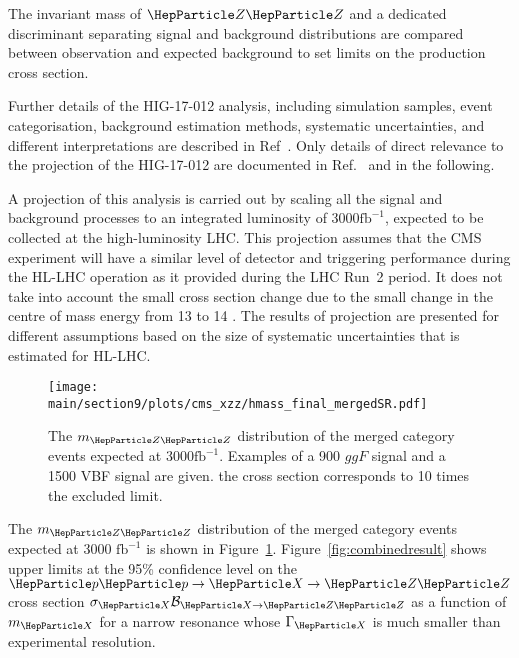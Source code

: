 The invariant mass of $\PZ \PZ$ and a dedicated discriminant separating signal and background distributions are compared between observation and expected background to set limits on the production cross section. 

Further details of the HIG-17-012 analysis, including simulation samples, event categorisation, background estimation methods, systematic uncertainties, and different interpretations are described in Ref~\cite{Sirunyan:2018qlb}. Only details of direct relevance to the projection of the HIG-17-012 are documented in Ref.~\cite{CMS-PAS-FTR-18-040} and in the following.  


A projection of this analysis is carried out by scaling all the signal
and background processes to an integrated luminosity of 3000$\mathrm{fb}^{-1}$, expected to be collected at the high-luminosity LHC. This projection assumes that the CMS experiment will have a similar level of detector and triggering performance during the HL-LHC operation as it provided during the LHC Run~2 period. It does not take into account the small cross section change due to the small change in the centre of mass energy from 13 \UTeV to 14 \UTeV. The results of projection are presented for different assumptions based on the size of systematic uncertainties that is estimated for HL-LHC. %

\begin{figure}[htbp]
        \centering
                \texttt{[image: \\main/section9/plots/cms\_xzz/hmass\_final\_mergedSR.pdf]}
                \caption{The $m_{\PZ\PZ}$ distribution of the merged category events expected at 3000$\mathrm{fb}^{-1}$. Examples of a 900 \UGeV $ggF$ signal and a 1500 \UGeV VBF signal are given. the cross section corresponds to 10 times the excluded limit. 
        \label{fig:mzz}
        }
            \end{figure}
The $m_{\PZ\PZ}$ distribution of the merged category events expected at 3000 $\mathrm{fb}^{-1}$ is shown in Figure~\ref{fig:mzz}. Figure~\ref{fig:combinedresult} shows upper limits at the 95\% confidence level on the $\Pp\Pp\to\PX\to\PZ\PZ$ cross section
$\sigma_{\PX} \mathcal{B}_{{\PX}\to\PZ\PZ}$ as a function of $m_{\PX}$ for a narrow resonance whose $\Gamma_{\PX}$ is much smaller than experimental resolution.

